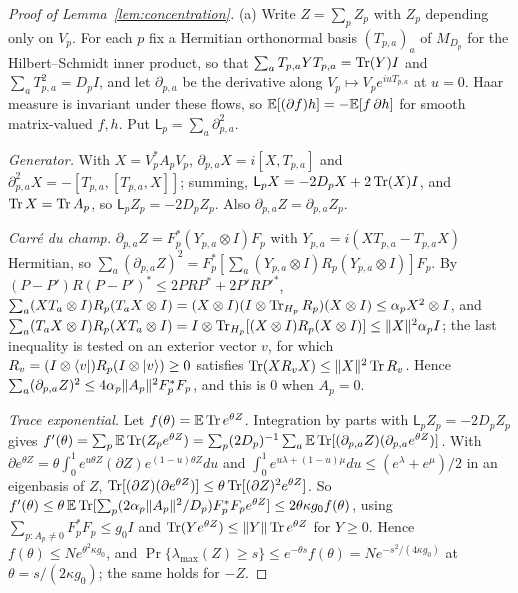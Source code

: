 \begin{proof}[Proof of Lemma~\ref{lem:concentration}]
(a) Write $Z=\sum_pZ_p$ with $Z_p$ depending only on $V_p$. For each $p$ fix a Hermitian orthonormal basis $(T_{p,a})_a$ of $M_{D_p}$ for the Hilbert--Schmidt
inner product, so that $\sum_aT_{p,a}YT_{p,a}=\operatorname{Tr}(Y)I$ and $\sum_aT_{p,a}^2=D_pI$, and let $\partial_{p,a}$ be the derivative along $V_p\mapsto V_pe^{iuT_{p,a}}$ at
$u=0$. Haar measure is invariant under these flows, so $\mathbb E[(\partial f)h]=-\mathbb E[f\,\partial h]$ for smooth matrix-valued $f,h$. Put
$\mathsf L_p=\sum_a\partial_{p,a}^2$.

\emph{Generator.} With $X=V_p^*A_pV_p$, $\partial_{p,a}X=i[X,T_{p,a}]$ and $\partial_{p,a}^2X=-[T_{p,a},[T_{p,a},X]]$; summing, $\mathsf L_pX=-2D_pX+2\operatorname{Tr}(X)I$, and
$\operatorname{Tr} X=\operatorname{Tr} A_p$, so $\mathsf L_pZ_p=-2D_pZ_p$. Also $\partial_{p,a}Z=\partial_{p,a}Z_p$.

\emph{Carr\'e du champ.} $\partial_{p,a}Z=F_p^*(Y_{p,a}\otimes I)F_p$ with $Y_{p,a}=i(XT_{p,a}-T_{p,a}X)$ Hermitian, so
$\sum_a(\partial_{p,a}Z)^2=F_p^*[\sum_a(Y_{p,a}\otimes I)R_p(Y_{p,a}\otimes I)]F_p$. By $(P-P')R(P-P')^*\le2PRP^*+2P'RP'^*$,
$\sum_a(XT_a\otimes I)R_p(T_aX\otimes I)=(X\otimes I)(I\otimes\operatorname{Tr}_{H_p}R_p)(X\otimes I)\le\alpha_pX^2\otimes I$, and
$\sum_a(T_aX\otimes I)R_p(XT_a\otimes I)=I\otimes\operatorname{Tr}_{H_p}[(X\otimes I)R_p(X\otimes I)]\le\lVert X\rVert^2\alpha_pI$; the last inequality is tested on an exterior vector
$v$, for which $R_v=(I\otimes\langle v\rvert)R_p(I\otimes\lvert v\rangle)\ge0$ satisfies $\operatorname{Tr}(XR_vX)\le\lVert X\rVert^2\operatorname{Tr} R_v$. Hence
$\sum_a(\partial_{p,a}Z)^2\le4\alpha_p\lVert A_p\rVert^2F_p^*F_p$, and this is $0$ when $A_p=0$.

\emph{Trace exponential.} Let $f(\theta)=\mathbb E\operatorname{Tr} e^{\theta Z}$. Integration by parts with $\mathsf L_pZ_p=-2D_pZ_p$ gives
$f'(\theta)=\sum_p\mathbb E\operatorname{Tr}(Z_pe^{\theta Z})=\sum_p(2D_p)^{-1}\sum_a\mathbb E\operatorname{Tr}[(\partial_{p,a}Z)(\partial_{p,a}e^{\theta Z})]$. With
$\partial e^{\theta Z}=\theta\int_0^1e^{u\theta Z}(\partial Z)e^{(1-u)\theta Z}du$ and $\int_0^1e^{u\lambda+(1-u)\mu}du\le(e^\lambda+e^\mu)/2$ in an eigenbasis of $Z$,
$\operatorname{Tr}[(\partial Z)(\partial e^{\theta Z})]\le\theta\operatorname{Tr}[(\partial Z)^2e^{\theta Z}]$. So
$f'(\theta)\le\theta\,\mathbb E\operatorname{Tr}[\sum_p(2\alpha_p\lVert A_p\rVert^2/D_p)F_p^*F_pe^{\theta Z}]\le2\theta\kappa g_0f(\theta)$, using
$\sum_{p:A_p\ne0}F_p^*F_p\le g_0I$ and $\operatorname{Tr}(Ye^{\theta Z})\le\lVert Y\rVert\operatorname{Tr} e^{\theta Z}$ for $Y\ge0$. Hence $f(\theta)\le Ne^{\theta^2\kappa g_0}$, and
$\Pr\{\lambda_{\max}(Z)\ge s\}\le e^{-\theta s}f(\theta)=Ne^{-s^2/(4\kappa g_0)}$ at $\theta=s/(2\kappa g_0)$; the same holds for $-Z$.


\end{proof}
